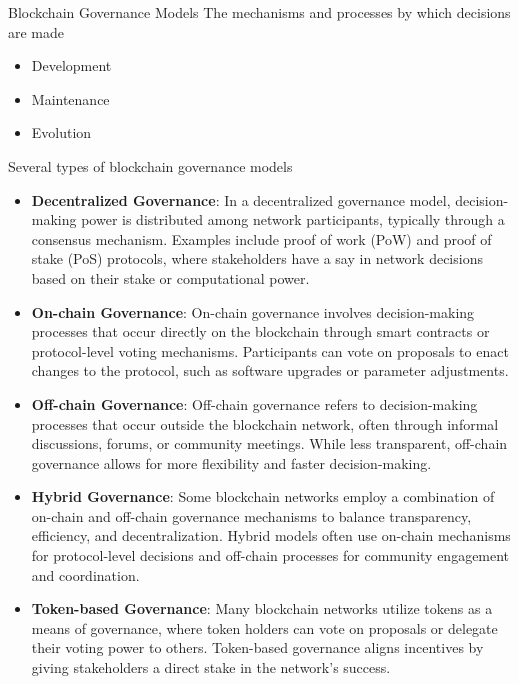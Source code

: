 \begin{frame}{Blockchain Governance Models}
    The mechanisms and processes by which decisions are made
    \begin{itemize}
        \item Development
        \item Maintenance
        \item Evolution
    \end{itemize}

    Several types of blockchain governance models
    \begin{itemize}
        \item \textbf{Decentralized Governance}: In a decentralized governance model, decision-making power is distributed among network participants, typically through a consensus mechanism. Examples include proof of work (PoW) and proof of stake (PoS) protocols, where stakeholders have a say in network decisions based on their stake or computational power.

        \item \textbf{On-chain Governance}: On-chain governance involves decision-making processes that occur directly on the blockchain through smart contracts or protocol-level voting mechanisms. Participants can vote on proposals to enact changes to the protocol, such as software upgrades or parameter adjustments.

        \item \textbf{Off-chain Governance}: Off-chain governance refers to decision-making processes that occur outside the blockchain network, often through informal discussions, forums, or community meetings. While less transparent, off-chain governance allows for more flexibility and faster decision-making.

        \item \textbf{Hybrid Governance}: Some blockchain networks employ a combination of on-chain and off-chain governance mechanisms to balance transparency, efficiency, and decentralization. Hybrid models often use on-chain mechanisms for protocol-level decisions and off-chain processes for community engagement and coordination.

        \item \textbf{Token-based Governance}: Many blockchain networks utilize tokens as a means of governance, where token holders can vote on proposals or delegate their voting power to others. Token-based governance aligns incentives by giving stakeholders a direct stake in the network's success.
    \end{itemize}
\end{frame}

